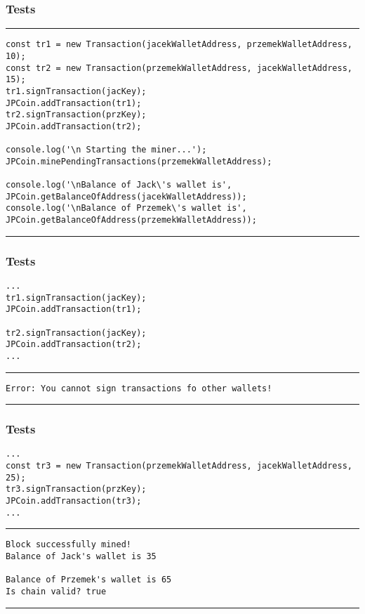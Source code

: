 \documentclass[14pt, aspectratio=169]{beamer}
\begin{document}
\begin{frame}[fragile]
\frametitle{Tests}
\scriptsize
\rule{\textwidth}{1pt}
\begin{verbatim}
const tr1 = new Transaction(jacekWalletAddress, przemekWalletAddress, 10);
const tr2 = new Transaction(przemekWalletAddress, jacekWalletAddress, 15);
tr1.signTransaction(jacKey);
JPCoin.addTransaction(tr1);
tr2.signTransaction(przKey);
JPCoin.addTransaction(tr2);

console.log('\n Starting the miner...');
JPCoin.minePendingTransactions(przemekWalletAddress);

console.log('\nBalance of Jack\'s wallet is', JPCoin.getBalanceOfAddress(jacekWalletAddress));
console.log('\nBalance of Przemek\'s wallet is', JPCoin.getBalanceOfAddress(przemekWalletAddress));
\end{verbatim}
\rule{\textwidth}{1pt}
\end{frame}

\begin{frame}[fragile]
\frametitle{Tests}
\scriptsize
\begin{verbatim}
...
tr1.signTransaction(jacKey);
JPCoin.addTransaction(tr1);

tr2.signTransaction(jacKey);
JPCoin.addTransaction(tr2);
...
\end{verbatim}
\scriptsize
\rule{\textwidth}{1pt}
\begin{verbatim}
Error: You cannot sign transactions fo other wallets!
\end{verbatim}
\rule{\textwidth}{1pt}
\end{frame}

\begin{frame}[fragile]
\frametitle{Tests}
\scriptsize
\begin{verbatim}
...
const tr3 = new Transaction(przemekWalletAddress, jacekWalletAddress, 25);
tr3.signTransaction(przKey);
JPCoin.addTransaction(tr3);
...
\end{verbatim}
\scriptsize
\rule{\textwidth}{1pt}
\begin{verbatim}
Block successfully mined!
Balance of Jack's wallet is 35

Balance of Przemek's wallet is 65
Is chain valid? true
\end{verbatim}
\rule{\textwidth}{1pt}
\end{frame}
\end{document}
